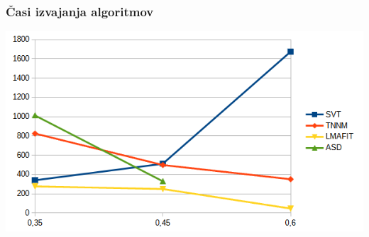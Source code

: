 \documentclass{beamer}
\begin{document}
\begin{frame}
  \frametitle{Časi izvajanja algoritmov}
  \includegraphics[width=\linewidth]{slike/gora/grafCas.png}
\end{frame}
\end{document}
